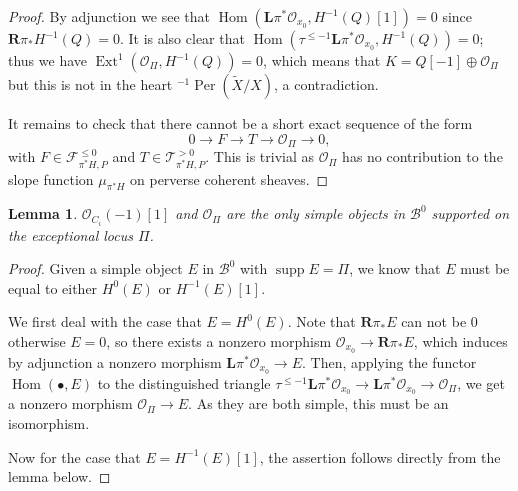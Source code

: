 \documentclass[12pt]{amsart}
\newtheorem{lemma}[theorem]{Lemma}
\theoremstyle{definition}
\DeclareMathOperator{\Hom}{Hom}
\DeclareMathOperator{\Ext}{Ext}
\DeclareMathOperator{\supp}{supp}
\DeclareMathOperator{\Per}{Per}
\begin{document}
\begin{proof}
By adjunction we see that $\Hom(\mathbf{L}\pi^\ast \mathcal{O}_{x_0} , H^{-1}(Q)[1])= 0$ since $\mathbf{R}\pi_\ast H^{-1}(Q)= 0$. 
It is also clear that $\Hom(\tau^{\leq -1}\mathbf{L}\pi^\ast \mathcal{O}_{x_0} , H^{-1}(Q))= 0$;
thus we have $\Ext^1(\mathcal{O}_{\Pi}, H^{-1}(Q)) = 0$,
which means that $K = Q[-1] \oplus \mathcal{O}_{\Pi}$ but this is not in the heart ${^{-1}\Per(\widetilde{X}/X)}$, a contradiction.

It remains to check that there cannot be a short exact sequence of the form
$$ 0 \longrightarrow F \longrightarrow T \longrightarrow \mathcal{O}_{\Pi} \longrightarrow 0,$$
with $F \in \mathcal{F}^{\leq 0}_{\pi^\ast H,P}$ and $T \in \mathcal{T}^{>0}_{\pi^\ast H,P}$.
This is trivial as $\mathcal{O}_{\Pi}$ has no contribution to the slope function $\mu_{\pi^\ast H}$ on perverse coherent sheaves.
\end{proof}

\begin{lemma}\label{simple2}
$\mathcal{O}_{C_i}(-1)[1]$ and $\mathcal{O}_{\Pi}$ are the only simple objects in $\mathcal{B}^0$ supported on the exceptional locus $\Pi$.
\end{lemma}
\begin{proof}
Given a simple object $E$ in $\mathcal{B}^0$ with $\supp E=\Pi$, we know that $E$ must be equal to either $H^0(E)$ or $H^{-1}(E)[1]$.

We first deal with the case that $E=H^0(E)$.
Note that $\mathbf{R}\pi_\ast E$ can not be $0$ otherwise $E=0$, 
so there exists a nonzero morphism $\mathcal{O}_{x_0} \longrightarrow \mathbf{R}\pi_\ast E$, 
which induces by adjunction a nonzero morphism $\mathbf{L}\pi^\ast \mathcal{O}_{x_0} \longrightarrow E$.
Then, applying the functor $\Hom (\bullet, E)$ to the distinguished triangle $\tau^{\leq -1}\mathbf{L}\pi^\ast \mathcal{O}_{x_0} \longrightarrow \mathbf{L}\pi^\ast \mathcal{O}_{x_0} \longrightarrow \mathcal{O}_{\Pi}$, we get a nonzero morphism $\mathcal{O}_{\Pi} \longrightarrow E$.
As they are both simple, this must be an isomorphism.

Now for the case that $E=H^{-1}(E)[1]$, the assertion follows directly from the lemma below.
\end{proof}
\end{document}
